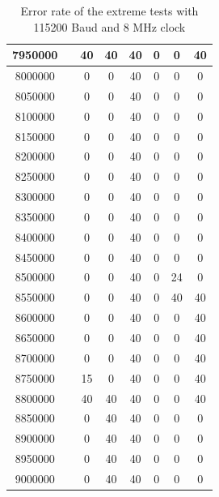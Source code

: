 \begin{table}[H]
\begin{center}
\begin{tabular}{| c  r || c | c | c | c | c | c |}
7950000  &    &  40   &  40      &   40     &  0   &  0   &  40 \\
    \hline
8000000  &    &  0    &  0       &   40     &  0   &  0   &  0 \\
8050000  &    &  0    &  0       &   40     &  0   &  0   &  0 \\
8100000  &    &  0    &  0       &   40     &  0   &  0   &  0 \\
8150000  &    &  0    &  0       &   40     &  0   &  0   &  0 \\
    \hline
8200000  &    &  0    &  0       &   40     &  0   &  0   &  0 \\
8250000  &    &  0    &  0       &   40     &  0   &  0   &  0 \\
8300000  &    &  0    &  0       &   40     &  0   &  0   &  0 \\
8350000  &    &  0    &  0       &   40     &  0   &  0   &  0 \\
    \hline
8400000  &    &  0    &  0       &   40     &  0   &  0   &  0 \\
8450000  &    &  0    &  0       &   40     &  0   &  0   &  0 \\
8500000  &    &  0    &  0       &   40     &  0   &  24  &  0 \\
8550000  &    &  0    &  0       &   40     &  0   &  40  &  40 \\
    \hline
8600000  &    &  0    &  0       &   40     &  0   &  0   &  40 \\
8650000  &    &  0    &  0       &   40     &  0   &  0   &  40 \\
8700000  &    &  0    &  0       &   40     &  0   &  0   &  40 \\
8750000  &    &  15   &  0       &   40     &  0   &  0   &  40 \\
    \hline
8800000  &    &  40   &  40      &   40     &  0   &  0   &  40 \\
8850000  &    &  0    &  40      &   40     &  0   &  0   &  0 \\
8900000  &    &  0    &  40      &   40     &  0   &  0   &  0 \\
8950000  &    &  0    &  40      &   40     &  0   &  0   &  0 \\
9000000  &    &  0    &  40      &   40     &  0   &  0   &  0 \\
    \hline
    \end{tabular}
  \end{center}
  \caption{Error rate of the extreme tests with 115200 Baud and 8 MHz clock}
  \label{tab:ExtremErrs}
\end{table}

